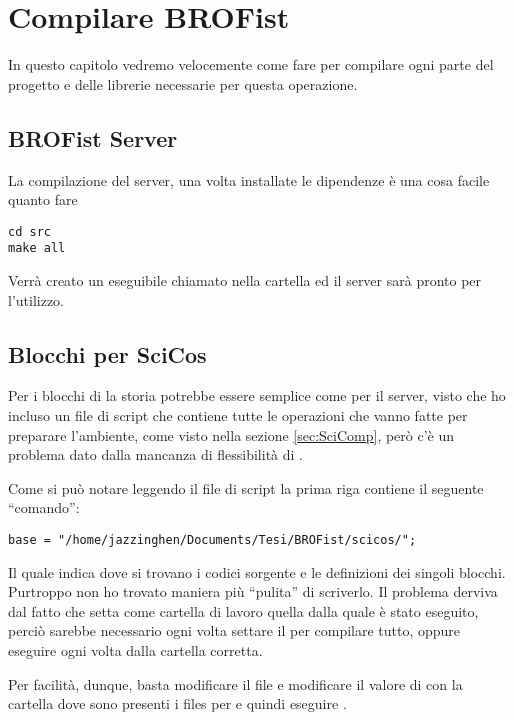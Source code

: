 \chapter{Compilare BROFist}
In questo capitolo vedremo velocemente come fare per compilare ogni parte
del progetto e delle librerie necessarie per questa operazione.

\section{BROFist Server}
La compilazione del server, una volta installate le dipendenze è una cosa
facile quanto fare
\begin{verbatim}
cd src
make all
\end{verbatim}
Verrà creato un eseguibile chiamato  nella cartella ed il
server sarà pronto per l'utilizzo.

\section{Blocchi per SciCos}
Per i blocchi di \SciCosLab{} la storia potrebbe essere semplice come per
il server, visto che ho incluso un file di script che contiene tutte le
operazioni che vanno fatte per preparare l'ambiente, come visto nella
sezione \ref{sec:SciComp}, però c'è un problema dato dalla mancanza di
flessibilità di \SciCosLab{}.

Come si può notare leggendo il file di script  la
prima riga contiene il seguente ``comando'':
\begin{verbatim}
base = "/home/jazzinghen/Documents/Tesi/BROFist/scicos/";
\end{verbatim}
Il quale indica dove si trovano i codici sorgente e le definizioni dei
singoli blocchi. Purtroppo non ho trovato maniera più ``pulita'' di
scriverlo. Il problema derviva dal fatto che \SciCosLab{} setta come
cartella di lavoro quella dalla quale è stato eseguito, perciò sarebbe
necessario ogni volta settare il  per compilare
tutto, oppure eseguire \SciCosLab{} ogni volta dalla cartella corretta.

Per facilità, dunque, basta modificare il file  e
modificare il valore di  con la cartella dove sono presenti i
files per \SciCosLab{} e quindi eseguire .


